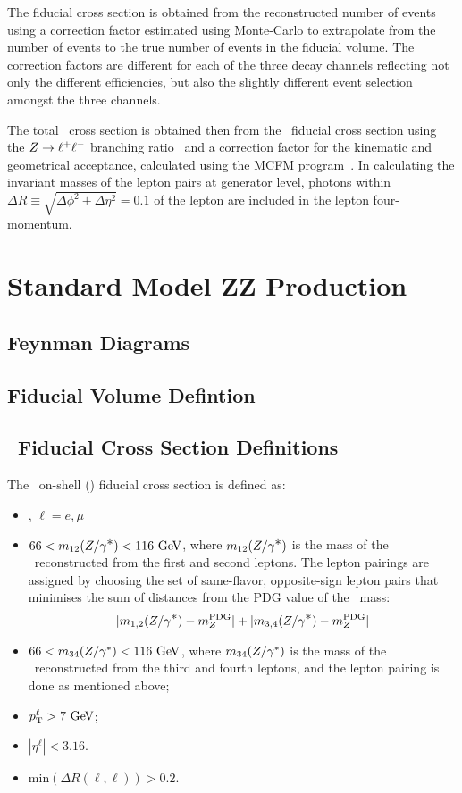 The fiducial cross section is obtained from the reconstructed number of events
using a correction factor estimated using Monte-Carlo to extrapolate from the
number of events to the true number of events in the fiducial volume. The
correction factors are different for each of the three decay channels reflecting
not only the different efficiencies, but also the slightly different event
selection amongst the three channels.

The total \ZZ\ cross section
is obtained then from the \ZZ\ fiducial cross section 
using the $Z\rightarrow\ell^+ \ell^-$ branching ratio~\cite{PDG} and a correction factor 
for the kinematic and geometrical acceptance, 
calculated using the MCFM program~\cite{Campbell:2011}.
In calculating the invariant masses of the lepton pairs at generator level, photons within 
$\Delta R \equiv \sqrt{\Delta \phi^2 + \Delta \eta^2} = 0.1$ of the lepton are included in the lepton four-momentum.    


\section{Standard Model ZZ Production}
\subsection{Feynman Diagrams}
\subsection{Fiducial Volume Defintion}

\subsection{\zzllll\ Fiducial Cross Section Definitions}

The \zzllll\ on-shell (\ZZ) fiducial cross section is defined as:
\begin{itemize}
\item{\ZorgZorglplmlplm, $\ell = e,\mu$}
\item{ $66 < m_{12}(\Zorgv) <  116\GeV$, where $m_{12}(Z/\gamma^{\textstyle *})$ is
the mass of the \Z\ reconstructed from the first and second leptons.  The
lepton pairings are assigned by choosing the set of 
same-flavor, opposite-sign lepton pairs that minimises the sum of distances from
the PDG value of the \Z\ mass:
\begin{equation}
|m_{1,2}(Z/\gamma^{\textstyle *}) - m_{Z}^{\rm PDG}| + |m_{3,4}(Z/\gamma^{\textstyle *}) - m_{Z}^{\rm PDG}|
\end{equation}
}
\item{ $66 < m_{34}(\Z/\gamma^*) <  116\GeV$, where $m_{34}(Z/\gamma^*)$ is
the mass of the \Z\ reconstructed from the third and fourth leptons, and the
lepton pairing is done as mentioned above;}
\item $\pT^{\ell} > 7\GeV$;
\item $|\eta^{\ell}| < 3.16$.
\item{$\mathrm{min}(\Delta R(\ell,\ell)) > 0.2$.}
\end{itemize}

